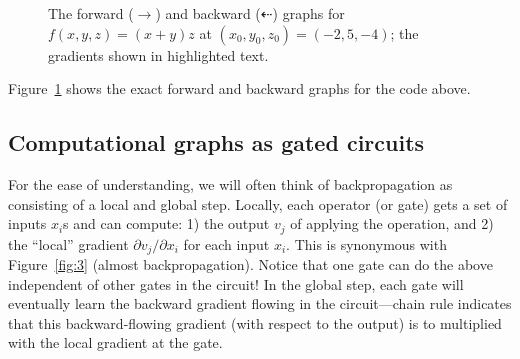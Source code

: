 \begin{figure}[!t]
\centering
{}
\caption{The forward ($\rightarrow$) and backward ($\dashleftarrow$) graphs for $f(x, y, z) = (x + y) z$ at $(x_0, y_0, z_0) = (-2, 5, -4)$; the gradients  shown in \colorbox{gray!30}{highlighted} text.}
\label{fig:4}
\end{figure}

Figure~\ref{fig:4} shows the exact forward and backward graphs for the code above.

\subsection{Computational graphs as gated circuits}
\label{sec:3.1}

For the ease of understanding, we will often think of backpropagation as consisting of a local and global step. Locally, each operator (or gate) gets a set of inputs $x_i$s and can compute: 1) the output $v_j$ of applying the operation, and 2) the ``local'' gradient $\partial v_j / \partial x_i$ for each input $x_i$. This is synonymous with Figure~\ref{fig:3} (almost backpropagation). Notice that one gate can do the above independent of other gates in the circuit! In the global step, each gate will eventually learn the backward gradient flowing in the circuit---chain rule indicates that this backward-flowing gradient (with respect to the output) is to multiplied with the local gradient at the gate.

